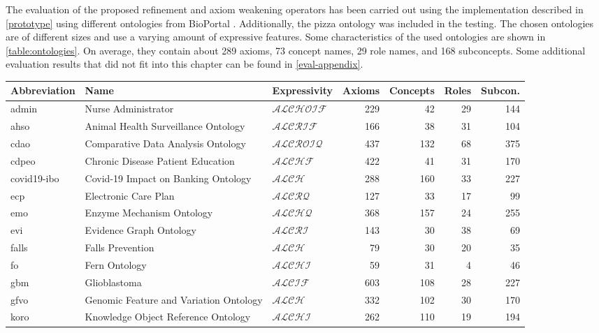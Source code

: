 
The evaluation of the proposed refinement and axiom weakening operators has been carried out using the implementation described in \cref{prototype} using different ontologies from BioPortal \cite{whetzel2011bioportal,bioportal}. Additionally, the pizza ontology \cite{pizzaontology} was included in the testing. The chosen ontologies are of different sizes and use a varying amount of expressive features. Some characteristics of the used ontologies are shown in \cref{table:ontologies}. On average, they contain about 289 axioms, 73 concept names, 29 role names, and 168 subconcepts. Some additional evaluation results that did not fit into this chapter can be found in \cref{eval-appendix}.

\begin{table}[ht]
  \scriptsize
  \centering
  \addtolength{\tabcolsep}{-0.75mm}
  \begin{tabular}{|l|llrrrr|}
    \hline
    Abbreviation & Name & Expressivity & Axioms & Concepts & Roles & Subcon. \\
    \hline
    admin & Nurse Administrator & $\mathcal{ALCHOIF}$ & 229 & 42 & 29 & 144 \\
    ahso & Animal Health Surveillance Ontology & $\mathcal{ALCRIF}$ & 166 & 38 & 31 & 104 \\
    cdao & Comparative Data Analysis Ontology & $\mathcal{ALCROIQ}$ & 437 & 132 & 68 & 375 \\
    cdpeo & Chronic Disease Patient Education & $\mathcal{ALCHF}$ & 422 & 41 & 31 & 170 \\
    covid19-ibo & Covid-19 Impact on Banking Ontology & $\mathcal{ALCH}$ & 288 & 160 & 33 & 227 \\
    ecp & Electronic Care Plan & $\mathcal{ALCRQ}$ & 127 & 33 & 17 & 99 \\
    emo & Enzyme Mechanism Ontology & $\mathcal{ALCHQ}$ & 368 & 157 & 24 & 255 \\
    evi & Evidence Graph Ontology & $\mathcal{ALCRI}$ & 143 & 30 & 38 & 69 \\
    falls & Falls Prevention & $\mathcal{ALCH}$ & 79 & 30 & 20 & 35 \\
    fo & Fern Ontology & $\mathcal{ALCHI}$ & 59 & 31 & 4 & 46 \\
    gbm & Glioblastoma & $\mathcal{ALCIF}$ & 603 & 108 & 28 & 227 \\
    gfvo & Genomic Feature and Variation Ontology & $\mathcal{ALCH}$ & 332 & 102 & 30 & 170 \\
    koro & Knowledge Object Reference Ontology & $\mathcal{ALCHI}$ & 262 & 110 & 19 & 194 \\

\end{tabular}
\end{table}
